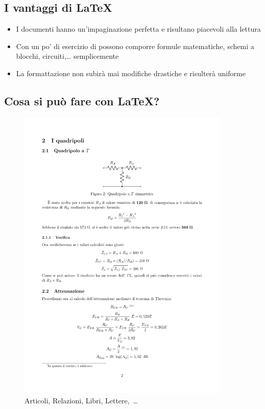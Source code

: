   \subsection{I vantaggi di \LaTeX}
\begin{itemize}
\item I documenti hanno un'impaginazione perfetta e risultano piacevoli alla lettura
\item Con un po' di esercizio di possono comporre formule matematiche, schemi a blocchi, circuiti,\dots{} semplicemente
\item La formattazione non subirà mai modifiche drastiche e risulterà uniforme
\end{itemize}
\newpage
\subsection{Cosa si può fare con \LaTeX?}
\begin{figure}[!h]\centering
  \includegraphics[trim={0 0 0 5.2cm},clip,width=0.9\textwidth]{img/relazione}
  \caption{Articoli, Relazioni, Libri, Lettere,~\dots}
\end{figure}
